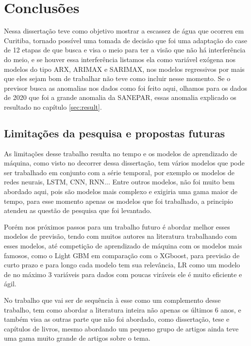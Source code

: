 \section{Conclus\~oes} \label{sec:conclusoes}

Nessa dissertação teve como objetivo mostrar a escassez de água que ocorreu em Curitiba, tornado possível uma tomada de decisão que foi uma adaptação do case de 12 etapas de  que busca e visa o meio para ter a visão que não há interferência do meio, e se houver essa interferência listamos ela como variável exógena nos modelos do tipo ARX, ARIMAX e SARIMAX, nos modelos regressivos por mais que eles sejam bom de trabalhar não teve como incluir nesse momento.  Se o previsor busca as anomalias nos dados como foi feito aqui, olhamos para os dados de 2020 que foi a grande anomalia da SANEPAR, essas anomalia explicado os resultado no capítulo \ref{sec:result}. 


    \subsection{Limita\c c\~oes da pesquisa e propostas futuras}

As limitações desse trabalho resulta no tempo e os modelos de aprendizado de máquina, como visto no decorrer dessa dissertação, tem vários modelos que pode ser trabalhado em conjunto com a série temporal, por exemplo os modelos de redes neurais, LSTM, CNN, RNN... Entre outros modelos, não foi muito bem abordado aqui, pois são modelos mais complexo e exigiria uma gama maior de tempo, para esse momento apenas os modelos que foi trabalhado, a principio atendeu as questão de pesquisa que foi levantado.

Porém nos próximos passos para um trabalho futuro é abordar melhor esses modelos de previsão, tendo com muitos autores na literatura trabalhando com esses modelos, até competição de aprendizado de máquina com os modelos mais famosos, como o Light GBM em comparação com o XGboost, para previsão de curto prazo e para longo cada modelo tem sua relevância, LR como um modelo de no máximo 3 variáveis para dados com poucas viráveis ele é muito eficiente e ágil.

No trabalho que vai ser de sequência à esse como um complemento desse trabalho, tem como abordar a literatura inteira não apenas os últimos 6 anos, e também visa as outras parte que não foi abordado, como dissertação, tese e capítulos de livros, mesmo abordando um pequeno grupo de artigos ainda teve uma gama muito grande de artigos sobre o tema. 

